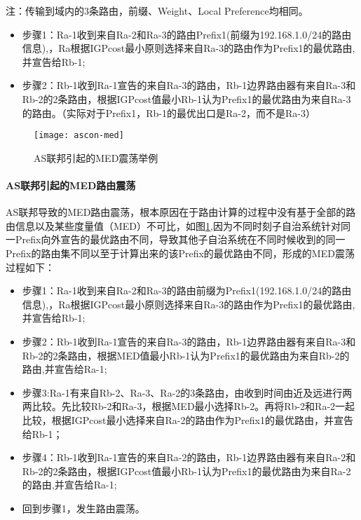 注：传输到域内的3条路由，前缀、Weight、Local Preference均相同。

\begin{itemize}
\item 步骤1：Ra-1收到来自Ra-2和Ra-3的路由Prefix1(前缀为192.168.1.0/24的路由信息),，Ra根据IGPcost最小原则选择来自Ra-3的路由作为Prefix1的最优路由,并宣告给Rb-1;
\item 步骤2：Rb-1收到Ra-1宣告的来自Ra-3的路由，Rb-1边界路由器有来自Ra-3和Rb-2的2条路由，根据IGPcost值最小Rb-1认为Prefix1的最优路由为来自Ra-3的路由。（实际对于Prefix1，Rb-1的最优出口是Ra-2，而不是Ra-3）
\end{itemize}


\begin{figure}
  \centering
  \texttt{[image: ascon-med]}
  \caption{AS联邦引起的MED震荡举例\cite{rfc3345}}
  \label{fig:ascon-med}
\end{figure}

\paragraph{AS联邦引起的MED路由震荡}
AS联邦导致的MED路由震荡\cite{rfc3345}，根本原因在于路由计算的过程中没有基于全部的路由信息以及某些度量值（MED）不可比，如图\ref{fig:ascon-med},因为不同时刻子自治系统针对同一Prefix向外宣告的最优路由不同，导致其他子自治系统在不同时候收到的同一Prefix的路由集不同以至于计算出来的该Prefix的最优路由不同，形成的MED震荡过程如下：


\begin{itemize}
  \item 步骤1：Ra-1收到来自Ra-2和Ra-3的路由前缀为Prefix1(192.168.1.0/24的路由信息),，Ra根据IGPcost最小原则选择来自Ra-3的路由作为Prefix1的最优路由,并宣告给Rb-1;
  \item 步骤2：Rb-1收到Ra-1宣告的来自Ra-3的路由，Rb-1边界路由器有来自Ra-3和Rb-2的2条路由，根据MED值最小Rb-1认为Prefix1的最优路由为来自Rb-2的路由,并宣告给Ra-1;
  \item 步骤3:Ra-1有来自Rb-2、Ra-3、Ra-2的3条路由，由收到时间由近及远进行两两比较。先比较Rb-2和Ra-3，根据MED最小选择Rb-2。再将Rb-2和Ra-2一起比较，根据IGPcost最小选择来自Ra-2的路由作为Prefix1的最优路由，并宣告给Rb-1；
  \item 步骤4：Rb-1收到Ra-1宣告的来自Ra-2的路由，Rb-1边界路由器有来自Ra-2和Rb-2的2条路由，根据IGPcost值最小Rb-1认为Prefix1的最优路由为来自Ra-2的路由,并宣告给Ra-1;
  \item 回到步骤1，发生路由震荡。
\end{itemize}


